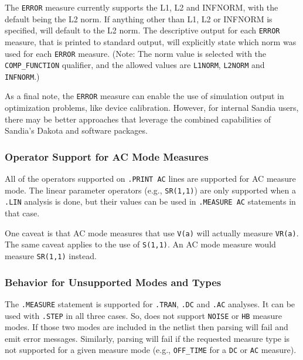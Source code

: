 \begin{XyceItemize}
  \item The {\tt ERROR} measure currently supports the L1, L2 and
    INFNORM, with the default being the L2 norm.  If anything other
    than L1, L2 or INFNORM is specified, \Xyce{} will default to the
    L2 norm.  The descriptive output for each {\tt ERROR} measure,
    that is printed to standard output, will explicitly state which
    norm was used for each {\tt ERROR} measure.  (Note: The norm value
    is selected with the {\tt COMP\_FUNCTION} qualifier, and the
    allowed values are {\tt L1NORM}, {\tt L2NORM} and {\tt INFNORM}.)

\end{XyceItemize}

As a final note, the \texttt{ERROR} measure can enable the use
of \Xyce{} simulation output in optimization problems, like device
calibration.  However, for internal Sandia users, there may be better
approaches that leverage the combined capabilities of Sandia's Dakota
and \Xyce{} software packages.

\subsubsection{Operator Support for AC Mode Measures}
\label{Measure_AC_Op_Support}
All of the operators supported on \texttt{.PRINT AC} lines are supported
for AC measure mode.  The linear parameter operators (e.g., \texttt{SR(1,1)})
are only supported when a \texttt{.LIN} analysis is done, but their values
can be used in \texttt{.MEASURE AC} statements in that case.

One caveat is that AC mode measures that use \texttt{V(a)} will actually
measure \texttt{VR(a)}. The same caveat applies to the use of \texttt{S(1,1)}.
An AC mode measure would measure \texttt{SR(1,1)} instead.

\subsubsection{Behavior for Unsupported Modes and Types}
\label{Measure_Unsupported_Types}
The \texttt{.MEASURE} statement is supported
for \texttt{.TRAN}, \texttt{.DC} and
\texttt{.AC} analyses. It can be used with {\tt .STEP} in all three cases.
So, \Xyce{} does not support \texttt{NOISE} or \texttt{HB} measure
modes.  If those two modes are included in the netlist then \Xyce{}
parsing will fail and emit error messages.  Similarly, \Xyce{} parsing
will fail if the requested measure type is not supported for a given
measure mode (e.g., \texttt{OFF\_TIME} for a \texttt{DC} or \texttt{AC} measure).

